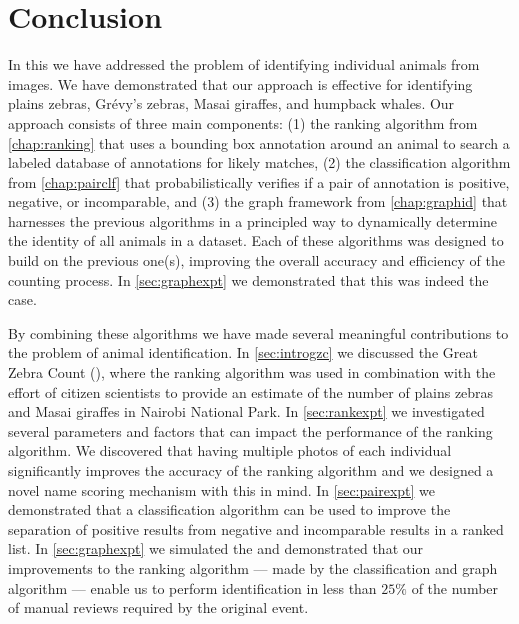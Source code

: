 \begin{comment}
    ./texfix.py --fpaths chapter6-conclusion.tex --outline --asmarkdown --numlines=99 -w
    fixtex --fpaths chapter6-conclusion.tex --outline --asmarkdown --numlines=999 --shortcite
\end{comment}

\chapter{Conclusion}\label{chap:conclusion} 

    In this \thesis{} we have addressed the problem of identifying individual animals from images.
    We have demonstrated that our approach is effective for identifying plains zebras, Grévy's zebras, Masai
      giraffes, and humpback whales.
    Our approach consists of three main components:
    (1) the ranking algorithm from \cref{chap:ranking} that uses a bounding box annotation around an animal to
      search a labeled database of annotations for likely matches,
    (2) the classification algorithm from \cref{chap:pairclf} that probabilistically verifies if a pair of
      annotation is positive, negative, or incomparable, and
    (3) the graph framework from \cref{chap:graphid} that harnesses the previous algorithms in a principled way
      to dynamically determine the identity of all animals in a dataset.
    Each of these algorithms was designed to build on the previous one(s), improving the overall accuracy and
      efficiency of the counting process.
    In \cref{sec:graphexpt} we demonstrated that this was indeed the case.

    By combining these algorithms we have made several meaningful contributions to the problem of animal
      identification.
    In \cref{sec:introgzc} we discussed the Great Zebra Count (\GZC{}), where the ranking algorithm was used in
      combination with the effort of citizen scientists to provide an estimate of the number of plains zebras and
      Masai giraffes in Nairobi National Park.
    In \cref{sec:rankexpt} we investigated several parameters and factors that can impact the performance of the
      ranking algorithm.
    We discovered that having multiple photos of each individual significantly improves the accuracy of the
      ranking algorithm and we designed a novel name scoring mechanism with this in mind.
    In \cref{sec:pairexpt} we demonstrated that a classification algorithm can be used to improve the separation
      of positive results from negative and incomparable results in a ranked list.
    In \cref{sec:graphexpt} we simulated the \GZC{} and demonstrated that our improvements to the ranking
      algorithm --- made by the classification and graph algorithm --- enable us to perform identification in less
      than $25\percent$ of the number of manual reviews required by the original event.


